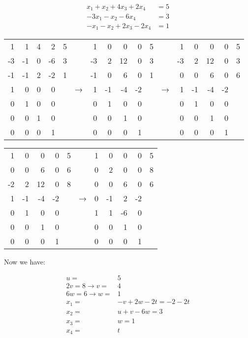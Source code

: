 \documentclass[11pt]{article}
\begin{document}
\begin{align*}
 x_1 + x_2 + 4x_3 + 2x_4 &= 5 \\
 -3x_1 -x_2 -6x_4 &=3 \\
 -x_1 - x_2 +2x_3 - 2x_4 &=1
\end{align*}

\begin{center}
\begin{tabular}{rrrrrlrrrrrlrrrrr}
1 & 1 & 4 & 2 & 5 &  & 1 & 0 & 0 & 0 & 5 &  & 1 & 0 & 0 & 0 & 5\\
-3 & -1 & 0 & -6 & 3 &  & -3 & 2 & 12 & 0 & 3 &  & -3 & 2 & 12 & 0 & 3\\
-1 & -1 & 2 & -2 & 1 &  & -1 & 0 & 6 & 0 & 1 &  & 0 & 0 & 6 & 0 & 6\\
\hline
1 & 0 & 0 & 0 &  & → & 1 & -1 & -4 & -2 &  & → & 1 & -1 & -4 & -2 & \\
0 & 1 & 0 & 0 &  &  & 0 & 1 & 0 & 0 &  &  & 0 & 1 & 0 & 0 & \\
0 & 0 & 1 & 0 &  &  & 0 & 0 & 1 & 0 &  &  & 0 & 0 & 1 & 0 & \\
0 & 0 & 0 & 1 &  &  & 0 & 0 & 0 & 1 &  &  & 0 & 0 & 0 & 1 & \\
\end{tabular}
\end{center}

\begin{center}
\begin{tabular}{rrrrrlrrrrr}
1 & 0 & 0 & 0 & 5 &  & 1 & 0 & 0 & 0 & 5\\
0 & 0 & 6 & 0 & 6 &  & 0 & 2 & 0 & 0 & 8\\
-2 & 2 & 12 & 0 & 8 &  & 0 & 0 & 6 & 0 & 6\\
\hline
1 & -1 & -4 & -2 &  & → & 0 & -1 & 2 & -2 & \\
0 & 1 & 0 & 0 &  &  & 1 & 1 & -6 & 0 & \\
0 & 0 & 1 & 0 &  &  & 0 & 0 & 1 & 0 & \\
0 & 0 & 0 & 1 &  &  & 0 & 0 & 0 & 1 & \\
\end{tabular}
\end{center}


Now we have:

\setcounter{equation}{0}
\begin{eqnarray*}
 u =& 5 \\
 2v = 8 \to v =& 4\\
 6w = 6 \to w =& 1\\
 x_1 =& -v + 2w - 2t = -2 -2t \\
 x_2 =& u + v - 6w = 3\\
 x_3 =& w = 1 \\
 x_4 =& t
\end{eqnarray*}
\end{document}

